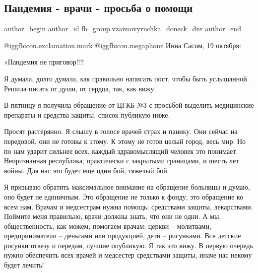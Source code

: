  
 
 
 
 
 
\subsection{Пандемия - врачи - просьба о помощи}
\label{sec:20_10_2020.fb.fb_group.vzaimovyruchka_doneck_dnr.1.pandemia_vrachi}
 
\ifcmt
 author_begin
   author_id fb_group.vzaimovyruchka_doneck_dnr
 author_end
\fi

@igg{fbicon.exclamation.mark}	 @igg{fbicon.megaphone}  Инна Сасим, 19 октября:

«Пандемия не приговор!!!!

Я думала, долго думала, как правильно написать пост, чтобы быть услышанной.
Решила писать от души, от сердца, так, как вижу.

В пятницу я получила обращение от ЦГКБ №3 с просьбой выделить медицинские
препараты и средства защиты, список публикую ниже.

Просят растерянно. Я слышу в голосе врачей страх и панику. Они сейчас на
передовой, они не готовы к этому. К этому не готов целый город, весь мир. Но по
нам ударит сильнее всех, каждый здравомыслящий человек это понимает.
Непризнанная республика, практически с закрытыми границами, и шесть лет войны.
Для нас это будет еще один бой, тяжелый бой.

Я призываю обратить максимальное внимание на обращение больницы и думаю, оно
будет не единичным. Это обращение не только к фонду, это обращение ко всем нам.
Врачам и медсестрам нужна помощь: средствами защиты, лекарствами. Поймите меня
правильно, врачи должны знать, что они не одни. А мы, общественность, как
можем, помогаем врачам: церкви – молитвами, предприниматели – деньгами или
продукцией, дети – рисунками. Все детские рисунки отвезу и передам, лучшие
опубликую. Я так это вижу. В первую очередь нужно обеспечить всех врачей и
медсестер средствами защиты, иначе нас некому будет лечить!

